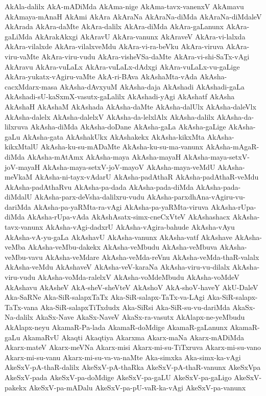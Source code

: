 {AkAla-dalilx
AkA-mADiMda
AkAma-nige
AkAma-tavx-vanenxV
AkAmavu
AkAmaya-mAnaH
AkAmi
AkAra
AkAraNa
AkAraNa-diMda
AkAraNa-diMdaleV
AkArada
AkAra-daMte
AkAra-dalilx
AkAra-diMda
AkAra-gaLanunx
AkAra-gaLiMda
AkArakAkxgi
AkAravU
AkAra-vanunx
AkAraveV
AkAra-vi-lalxda
AkAra-vilalxde
AkAra-vilalxveMdu
AkAra-vi-ra-beVku
AkAra-viruva
AkAra-viru-vaMte
AkAra-viru-vudu
AkAra-visheVSa-daMte
AkAra-vi-shi-SaTx-vAgi
AkAravu
AkAra-vuLaLx
AkAra-vuLaLx-dAdxgi
AkAra-vuLaLx-vu-gaLige
AkAra-yukatx-vAgiru-vaMte
AkA-ri-BAva
AkAshaMta-vAda
AkAsha-cacxMdarx-masa
AkAsha-dAvxyuM
AkAsha-daja
AkAshadi
AkAshadi-gaLa
AkAshadi-sU-kaSxmX-vasutx-gaLalilx
AkAshadi-yAgi
AkAshatf
AkAsha
AkAshaH
AkAshaM
AkAshada
AkAsha-daMte
AkAsha-dalUlx
AkAsha-daleVlx
AkAsha-dalelx
AkAsha-dalelxV
AkAsha-da-lelxlAlx
AkAsha-dalilx
AkAsha-da-lilxruva
AkAsha-diMda
AkAsha-doDane
AkAsha-gaLa
AkAsha-gaLige
AkAsha-gaLu
AkAsha-gata
AkAshakUkx
AkAshakekx
AkAsha-kikxMta
AkAsha-kikxMtalU
AkAsha-ku-su-mADaMte
AkAsha-ku-su-ma-vanunx
AkAsha-mAgaR-diMda
AkAsha-mAtAmx
AkAsha-maya
AkAsha-mayaH
AkAsha-maya-setxV-joV-mayaH
AkAsha-maya-setxV-joV-mayoV
AkAsha-maya-veMdU
AkAsha-meVkaM
AkAsha-ni-tayx-vAdarU
AkAsha-padAthaR
AkAsha-padAthaR-veMdu
AkAsha-padAthaRvu
AkAsha-pa-dada
AkAsha-pada-diMda
AkAsha-pada-diMdalU
AkAsha-parx-deVsha-dalilxru-vudu
AkAsha-parxdhAna-vAgiru-vu-dariMda
AkAsha-pa-yaRMta-ra-vAgi
AkAsha-pa-yaRMta-viruva
AkAsha-rUpa-diMda
AkAsha-rUpa-vAda
AkAshAsatx-simx-cneCxVteV
AkAshashacx
AkAsha-tavx-vanunx
AkAsha-vAgi-dadxrU
AkAsha-vAgira-bahude
AkAsha-vAyu
AkAsha-vA-yu-gaLa
AkAshavU
AkAsha-vanunx
AkAsha-vatf
AkAshave
AkAsha-veMba
AkAsha-veMbu-dakekx
AkAsha-veMbudu
AkAsha-veMbuva
AkAsha-veMbu-vavu
AkAsha-veMdare
AkAsha-veMda-reVnu
AkAsha-veMda-thaR-valalx
AkAsha-veMdu
AkAshaveV
AkAsha-veV-karaNa
AkAsha-viru-vu-dilalx
AkAsha-viru-vudu
AkAsha-voMda-ralelxV
AkAsha-voMdeMbudu
AkAsha-voMdeV
AkAshavu
AkAsheV
AkA-sheV-sheVteV
AkAshoV
AkA-shoV-haveY
AkU-DaleV
Aka-SaRNe
Aka-SiR-salapxTaTx
Aka-SiR-salapx-TaTx-va-LAgi
Aka-SiR-salapx-TaTx-vana
Aka-SiR-salapxTiTxdudx
Aka-SiRsi
Aka-SiR-su-vu-dariMda
AkaSx-Na-dalilx
AkaSx-Nave
AkaSx-NaveV
AkaSx-ra-vasutx
AkAlapx-ne-yeMbudu
AkAlapx-neyu
AkamaR-Pa-lada
AkamaR-doMdige
AkamaR-gaLanunx
AkamaR-gaLu
AkamaRvU
Akaqti
Akaqtiya
Akarxma
Akarx-maNa
Akarx-mADiMda
Akarx-mateV
Akarx-meVNa
Akarx-misi
Akarx-mi-su-TiTxruva
Akarx-mi-su-vano
Akarx-mi-su-vanu
Akarx-mi-su-va-va-naMte
Aka-simxka
Aka-simx-ka-vAgi
AkeSxV-pA-thaR-dalilx
AkeSxV-pA-thaRka
AkeSxV-pA-thaR-vanunx
AkeSxVpa
AkeSxV-pada
AkeSxV-pa-doMdige
AkeSxV-pa-gaLU
AkeSxV-pa-gaLigo
AkeSxV-pakekx
AkeSxV-pa-mADalu
AkeSxV-pa-pU-vaR-ka-vAgi
AkeSxV-pa-vanunx
}
